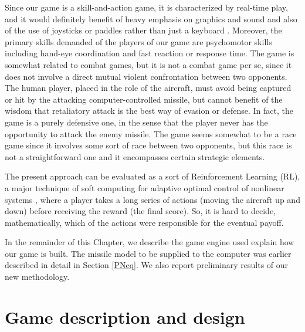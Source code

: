 Since our game is a skill-and-action game, it is characterized by real-time play, and it would definitely benefit of heavy emphasis on graphics and sound and also of the use of joysticks or paddles rather than just a keyboard \cite{crawford1984art}. Moreover, the primary skills demanded of the players of our game are psychomotor skills including hand-eye coordination and fast reaction or response time. The game is somewhat related to combat games, but it is not a combat game per se, since it does not involve a direct mutual violent confrontation between two opponents. The human player, placed in the role of the aircraft, must avoid being captured or hit by the attacking computer-controlled missile, but cannot benefit of the wisdom that retaliatory attack is the best way of evasion or defense.  In fact, the game is a purely defensive one, in the sense that the player never has the opportunity to attack the enemy missile. The game seems somewhat to be a race game since it involves some sort of race between two opponents, but this race is not a straightforward one and it encompasses certain strategic elements.

The present approach can be evaluated as a sort of Reinforcement Learning (RL), a major technique of soft computing for adaptive optimal control of nonlinear systems \cite{liu2009pursuit,sharma2010synergizing,doya2000reinforcement}, where a player takes a long series of actions (moving the aircraft up and down) before receiving the reward (the final score). So, it is hard to decide, mathematically, which of the actions were responsible for the eventual payoff.

In the remainder of this Chapter, we describe the game engine used explain how our game is built. The missile model to be supplied to the computer was earlier described in detail in Section \ref{PNeq}. We also report preliminary results of our new methodology.


\section{Game description and design}

